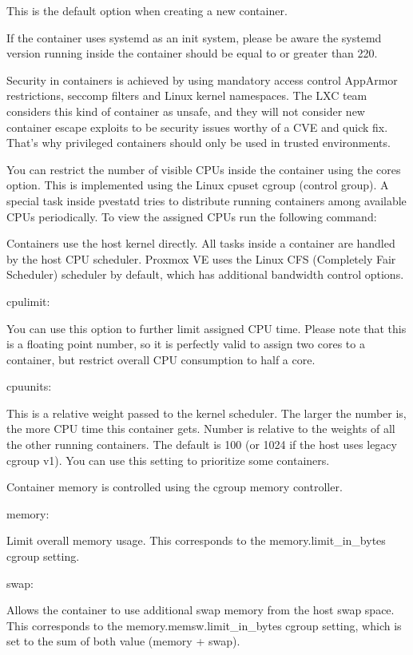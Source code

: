 This is the default option when creating a new container.

If the container uses systemd as an init system, please be aware the systemd version running inside the container should be equal to or greater than 220.

Security in containers is achieved by using mandatory access control AppArmor restrictions, seccomp filters and Linux kernel namespaces. The LXC team considers this kind of container as unsafe, and they will not consider new container escape exploits to be security issues worthy of a CVE and quick fix. That’s why privileged containers should only be used in trusted environments.

You can restrict the number of visible CPUs inside the container using the cores option. This is implemented using the Linux cpuset cgroup (control group). A special task inside pvestatd tries to distribute running containers among available CPUs periodically. To view the assigned CPUs run the following command:

Containers use the host kernel directly. All tasks inside a container are handled by the host CPU scheduler. Proxmox VE uses the Linux CFS (Completely Fair Scheduler) scheduler by default, which has additional bandwidth control options.

cpulimit:

You can use this option to further limit assigned CPU time. Please note that this is a floating point number, so it is perfectly valid to assign two cores to a container, but restrict overall CPU consumption to half a core.

cpuunits:

This is a relative weight passed to the kernel scheduler. The larger the number is, the more CPU time this container gets. Number is relative to the weights of all the other running containers. The default is 100 (or 1024 if the host uses legacy cgroup v1). You can use this setting to prioritize some containers.

Container memory is controlled using the cgroup memory controller.

memory:

Limit overall memory usage. This corresponds to the memory.limit_in_bytes cgroup setting.

swap:

Allows the container to use additional swap memory from the host swap space. This corresponds to the memory.memsw.limit_in_bytes cgroup setting, which is set to the sum of both value (memory + swap).

